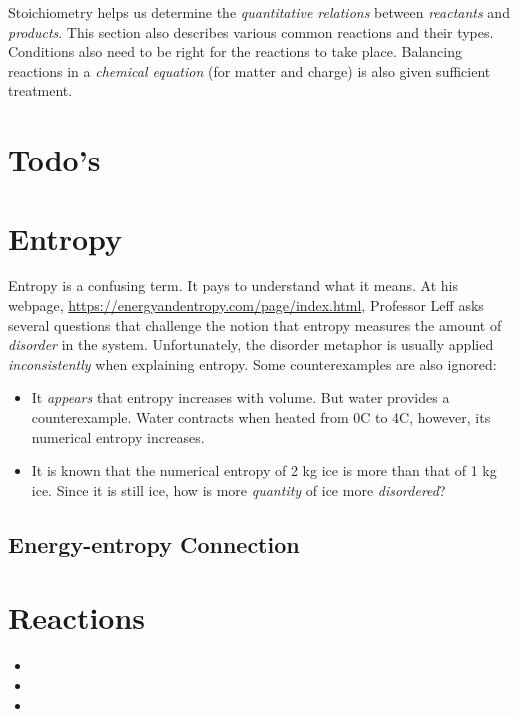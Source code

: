 \documentclass{article}
\begin{document}
\label{sec: stoichiometry}
Stoichiometry helps us determine the \textit{quantitative relations} between \textit{reactants} and \textit{products}. This section also describes various common reactions and their types. Conditions also need to be right for the reactions to take place. Balancing reactions in a \textit{chemical equation} (for matter and charge) is also given sufficient treatment.

\section{Todo's} 
\section{Entropy}
Entropy is a confusing term. It pays to understand what it means.
At his webpage, \url{https://energyandentropy.com/page/index.html}, Professor Leff asks several questions that challenge the notion that entropy measures the amount of \textit{disorder} in the system. Unfortunately, the disorder metaphor is usually applied \textit{inconsistently} when explaining entropy. Some counterexamples are also ignored:
\begin{itemize}
    \item It \textit{appears} that entropy increases with volume. But water provides a counterexample. Water contracts when heated from 0\degree C to 4\degree C, however, its numerical entropy increases.
    \item It is known that the numerical entropy of 2 kg ice is more than that of 1 kg ice. Since it is still ice, how is more \textit{quantity} of ice more \textit{disordered}?
\end{itemize}

\subsection{Energy-entropy Connection}

\section{Reactions}
\begin{itemize}
    \item {}
    \item {}
    \item {}
\end{itemize}
\end{document}
